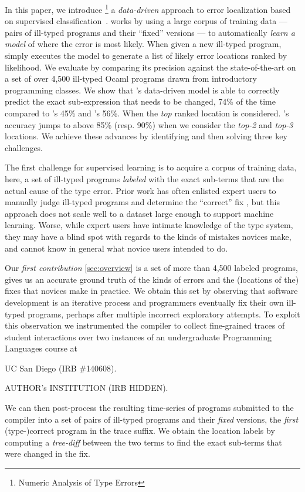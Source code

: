 %
In this paper, we introduce \toolname \footnote{Numeric Analysis of Type Errors}
a \emph{data-driven} approach to error
localization based on supervised
classification~\citep{Kotsiantis2007-pj}.
%
\toolname works by using a large corpus
of training data --- pairs of ill-typed
programs and their ``fixed'' versions ---
to automatically \emph{learn a model}
of where the error is most likely.
%
When given a new ill-typed program,
\toolname simply executes the model
to generate a list of likely error
locations ranked by likelihood.
%
We evaluate \toolname by comparing its
precision against the state-of-the-art
on a set of over 4,500 ill-typed Ocaml
programs drawn from introductory
programming classes.
%
We show that \toolname's data-driven
model is able to correctly predict
the exact sub-expression that needs to
be changed, 74\% of the time compared
to \ocaml's 45\% and \sherrloc's 56\%.
%
When the \emph{top} ranked location
is considered. \toolname's accuracy jumps
to above 85\% (resp. 90\%) when we consider
the \emph{top-2} and \emph{top-3} locations.
%
We achieve these advances by identifying
and then solving three key challenges.

%
The first challenge for supervised learning
is to acquire a corpus of training data, here,
a set of ill-typed programs \emph{labeled}
with the exact sub-terms that are the actual
cause of the type error.
%
Prior work has often enlisted expert users
to manually judge ill-typed programs and
determine the ``correct'' fix \citep[\eg][]{Loncaric2016-uk},
but this approach does not scale well to
a dataset large enough to support machine
learning.
%
Worse, while expert users have intimate
knowledge of the type system, they may
have a blind spot with regards to the
kinds of mistakes novices make, and
cannot know in general what novice users
intended to do.

Our \emph{first contribution} \autoref{sec:overview}
is a set of more than 4,500 labeled programs,
gives us an accurate ground truth of
the kinds of errors and the (locations
of the) fixes that novices make in
practice.
%
We obtain this set by observing that
software development is an iterative
process and programmers eventually
fix their own ill-typed programs,
perhaps after multiple incorrect
exploratory attempts.
%
To exploit this observation we instrumented
the \ocaml compiler to collect fine-grained
traces of student interactions over two instances
of an undergraduate Programming Languages course at
%
\begin{anonsuppress}
UC San Diego (IRB \#140608).
\end{anonsuppress}
\begin{noanonsuppress}
AUTHOR's INSTITUTION (IRB HIDDEN).
\end{noanonsuppress}
%
We can then post-process the resulting time-series
of programs submitted to the \ocaml compiler into
a set of pairs of ill-typed programs and their
\emph{fixed} versions, the \emph{first} (type-)correct
program in the trace suffix.
%
We obtain the location labels by computing a
\emph{tree-diff} between the two terms to find
the exact sub-terms that were changed in the fix.

